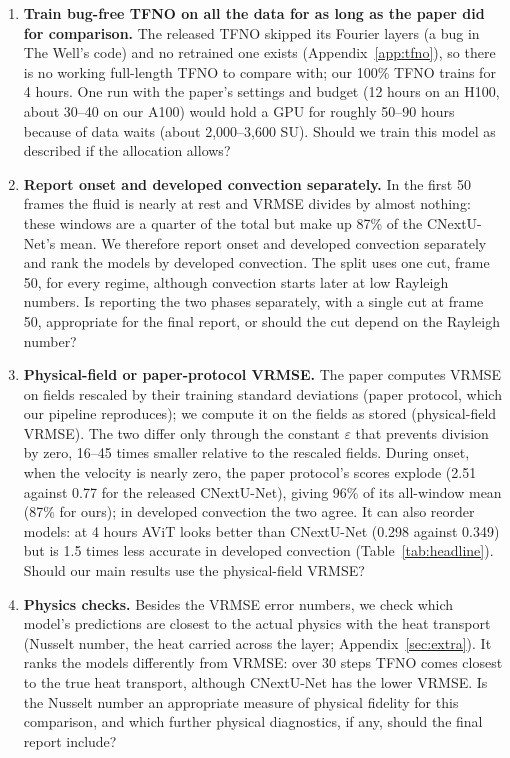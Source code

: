 \documentclass[11pt]{article}
\begin{document}
\begin{enumerate}
    \item \label{q:tfno}\textbf{Train bug-free TFNO on all the data for as long as the paper did for comparison.} The released
    TFNO skipped its Fourier layers (a bug in The Well's code) and no retrained one exists (Appendix~\ref{app:tfno}),
    so there is no working full-length TFNO to compare with; our 100\% TFNO trains for 4 hours. One run with the
    paper's settings and budget (12 hours on an H100, about 30--40 on our A100) would hold a GPU for roughly 50--90
    hours because of data waits (about 2,000--3,600 SU). Should we train this model as described if the allocation
    allows?

        \item \label{q:split}\textbf{Report onset and developed convection separately.} In the first 50 frames the
    fluid is nearly at rest and VRMSE divides by almost nothing: these windows are a quarter of the total but make
    up 87\% of the CNextU-Net's mean. We therefore report onset and developed convection separately and
    rank the models by developed convection. The split uses one cut, frame 50, for every regime, although
    convection starts later at low Rayleigh numbers. Is reporting the two phases separately, with a
    single cut at frame 50, appropriate for the final report, or should the cut depend on the Rayleigh number?

    \item \label{q:onestep}\textbf{Physical-field or paper-protocol VRMSE.} The paper computes VRMSE on fields
    rescaled by their training standard deviations (paper protocol, which our pipeline reproduces); we compute it on
    the fields as stored (physical-field VRMSE). The two differ only through the constant $\varepsilon$ that prevents
    division by zero, 16--45 times smaller relative to the rescaled fields. During onset, when the velocity is nearly
    zero, the paper protocol's scores explode (2.51 against 0.77 for the released CNextU-Net), giving 96\% of its
    all-window mean (87\% for ours); in developed convection the two agree. It can also
    reorder models: at 4 hours AViT looks better than CNextU-Net (0.298 against 0.349) but is 1.5 times less
    accurate in developed convection (Table~\ref{tab:headline}). Should our main results use the physical-field
    VRMSE?

    \item \label{q:physics}\textbf{Physics checks.} Besides the VRMSE error numbers, we check which model's
    predictions are closest to the actual physics with the heat transport (Nusselt number, the heat carried across
    the layer; Appendix~\ref{sec:extra}). It ranks the models differently from VRMSE: over 30 steps TFNO comes
    closest to the true heat transport, although CNextU-Net has the lower VRMSE. Is the Nusselt number an
    appropriate measure of physical fidelity for this comparison, and which further physical diagnostics, if any,
    should the final report include?


\end{enumerate}
\end{document}
